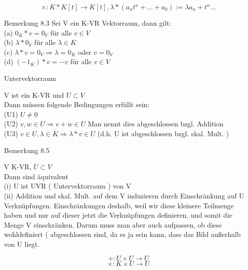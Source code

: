 \documentclass[headsepline,12pt,a4paper]{scrartcl}
\begin{document}
$$ \times : K * K[t] \rightarrow K[t] , \lambda * (a_n t^n + ... + a_0 ) := \lambda a_n + t^n ... $$ 

\item[Bemerkung 8.3]
Sei V ein K-VR Vektorraum, dann gilt: \\


(a) $ 0_K * v= 0_V $ für alle $ v \in V $ \\

(b) $\lambda * 0_V $ für alle $\lambda \in K $ \\

(c) $\lambda * v = 0_V  \Rightarrow \lambda = 0_K $ oder $ v = 0_V$ \\

(d) $(-1_K) * v = -v $ für alle $v\in V$ \\

\newpage

\begin{center}
\item[Untervektorraum]
\end{center}
\item V ist ein K-VR und $ U \subset V $ \\
Dann müssen folgende Bedingungen erfüllt sein: \\

(U1) $ U \neq 0 $ \\
(U2) $v,w \in U \Rightarrow v+w \in U $ Man nennt dies abgeschlossen bzgl. Addition  \\
(U3) $v \in U , \lambda \in K  \Rightarrow \lambda  * v \in U $ (d.h. U ist abgeschlossen bzgl. skal. Mult. )\\

\item[Bemerkung 8.5]
\item V K-VR, $ U \subset V $ \\
Dann sind äquivalent \\

(i) U ist UVR ( Untervektorraum ) von V \\

(ii) Addition und skal. Mult. auf dem V induzieren durch Einschränkung auf U Verknüpfungen. Einschränkungen deshalb, weil wir diese kleinere Teilmenge haben und nur auf dieser jetzt die Verknüpfungen definieren, und somit die Menge V einschränken. Darum muss man aber auch aufpassen, ob diese wohldefiniert ( abgeschlossen sind, da es ja sein kann, dass das Bild außerhalb von U liegt. 

$$ +: U \times U \rightarrow U $$
$$ \times: K \times U \rightarrow U $$ 
\end{document}
